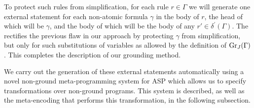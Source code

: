 To protect such rules from simplification, for each rule
$r \in \Gamma$ we will generate one external statement for each
non-atomic formula $\gamma$ in the body of $r$, the head of which will
be $\gamma$, and the body of which will be the body of any
$r' \in \delta^\prime(\Gamma)$. The rectifies the previous flaw in our
approach by protecting $\gamma$ from simplification, but only for such
substitutions of variables as allowed by the definition of
$\operatorname{Gr}_{J}(\Gamma)$. This completes the description of our grounding
method.

We carry out the generation of these external statements automatically
using a novel non-ground meta-programming system for ASP which allows
us to specify transformations over non-ground programs. This system is
described, as well as the meta-encoding that performs this
transformation, in the following subsection.
